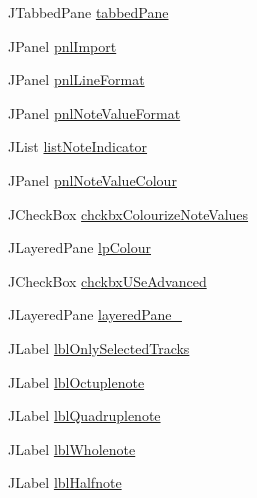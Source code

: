 \begin{DoxyCompactItemize}
\item 
J\+Tabbed\+Pane \hyperlink{classcom_1_1lclion_1_1midigui_1_1_dialog_track_import_aabdef38c0485e13cc93dc138342e4245}{tabbed\+Pane}
\item 
J\+Panel \hyperlink{classcom_1_1lclion_1_1midigui_1_1_dialog_track_import_a063461ce812abd701b93ebc7b9febb5f}{pnl\+Import}
\item 
J\+Panel \hyperlink{classcom_1_1lclion_1_1midigui_1_1_dialog_track_import_ad869cf75b335e3801223a73a4c0f6662}{pnl\+Line\+Format}
\item 
J\+Panel \hyperlink{classcom_1_1lclion_1_1midigui_1_1_dialog_track_import_a65201fce5439e97384f6b927a7550be2}{pnl\+Note\+Value\+Format}
\item 
J\+List \hyperlink{classcom_1_1lclion_1_1midigui_1_1_dialog_track_import_a8448bcb31eca04209e4985f870f95315}{list\+Note\+Indicator}
\item 
J\+Panel \hyperlink{classcom_1_1lclion_1_1midigui_1_1_dialog_track_import_a0c95d840f4e0fcda4909967c37c6d781}{pnl\+Note\+Value\+Colour}
\item 
J\+Check\+Box \hyperlink{classcom_1_1lclion_1_1midigui_1_1_dialog_track_import_a59dc935aec2200b178464745e0a145ee}{chckbx\+Colourize\+Note\+Values}
\item 
J\+Layered\+Pane \hyperlink{classcom_1_1lclion_1_1midigui_1_1_dialog_track_import_a770ef37f70c3f6f0dfb3e212de32d74c}{lp\+Colour}
\item 
J\+Check\+Box \hyperlink{classcom_1_1lclion_1_1midigui_1_1_dialog_track_import_a372664d11a9dd7bcc42dea9bc2c58823}{chckbx\+U\+Se\+Advanced}
\item 
J\+Layered\+Pane \hyperlink{classcom_1_1lclion_1_1midigui_1_1_dialog_track_import_ae3a0497765f00d7c86b33d5b71d6bc53}{layered\+Pane\+\_}
\item 
J\+Label \hyperlink{classcom_1_1lclion_1_1midigui_1_1_dialog_track_import_ab6faff098d93514ed68471244b9dca08}{lbl\+Only\+Selected\+Tracks}
\item 
J\+Label \hyperlink{classcom_1_1lclion_1_1midigui_1_1_dialog_track_import_ad4f278f27ad89812d6ed6e2394ce9cc1}{lbl\+Octuplenote}
\item 
J\+Label \hyperlink{classcom_1_1lclion_1_1midigui_1_1_dialog_track_import_a7816a2e010eec64ffc3174d617cf35df}{lbl\+Quadruplenote}
\item 
J\+Label \hyperlink{classcom_1_1lclion_1_1midigui_1_1_dialog_track_import_ac7d0bd7b65f556b4d22af7330dd76dcc}{lbl\+Wholenote}
\item 
J\+Label \hyperlink{classcom_1_1lclion_1_1midigui_1_1_dialog_track_import_acfcb2859ddf942402ad2cacd6667927d}{lbl\+Halfnote}

\end{DoxyCompactItemize}
